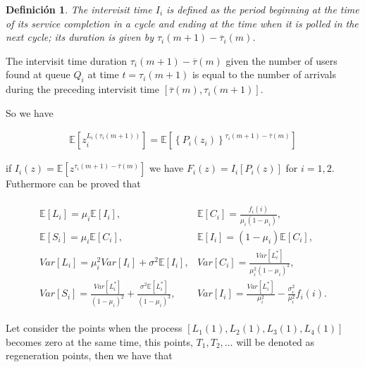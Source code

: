 \documentclass{article}
\newtheorem{Def}{Definición}
\newcommand{\esp}{\mathbb{E}}
\begin{document}
\begin{Def}
The intervisit time $I_{i}$ is defined as the period beginning at the time of its service completion in a cycle and ending at the time when it is polled in the next cycle; its duration is given by $\tau_{i}\left(m+1\right)-\overline{\tau}_{i}\left(m\right)$.
\end{Def}

The intervisit time duration $\tau_{i}\left(m+1\right)-\overline{\tau}\left(m\right)$ given the number of users found at queue $Q_{i}$ at time $t=\tau_{i}\left(m+1\right)$ is equal to the number of arrivals during the preceding intervisit time $\left[\overline{\tau}\left(m\right),\tau_{i}\left(m+1\right)\right]$. 

So we have



\begin{eqnarray*}
\esp\left[z_{i}^{L_{i}\left(\tau_{i}\left(m+1\right)\right)}\right]=\esp\left[\left\{P_{i}\left(z_{i}\right)\right\}^{\tau_{i}\left(m+1\right)-\overline{\tau}\left(m\right)}\right]
\end{eqnarray*}

if $I_{i}\left(z\right)=\esp\left[z^{\tau_{i}\left(m+1\right)-\overline{\tau}\left(m\right)}\right]$
we have $F_{i}\left(z\right)=I_{i}\left[P_{i}\left(z\right)\right]$
for $i=1,2$. Futhermore can be proved that

\begin{eqnarray}
\begin{array}{ll}
\esp\left[L_{i}\right]=\mu_{i}\esp\left[I_{i}\right], &
\esp\left[C_{i}\right]=\frac{f_{i}\left(i\right)}{\mu_{i}\left(1-\mu_{i}\right)},\\
\esp\left[S_{i}\right]=\mu_{i}\esp\left[C_{i}\right],&
\esp\left[I_{i}\right]=\left(1-\mu_{i}\right)\esp\left[C_{i}\right],\\
Var\left[L_{i}\right]= \mu_{i}^{2}Var\left[I_{i}\right]+\sigma^{2}\esp\left[I_{i}\right],& 
Var\left[C_{i}\right]=\frac{Var\left[L_{i}^{*}\right]}{\mu_{i}^{2}\left(1-\mu_{i}\right)^{2}},\\
Var\left[S_{i}\right]= \frac{Var\left[L_{i}^{*}\right]}{\left(1-\mu_{i}\right)^{2}}+\frac{\sigma^{2}\esp\left[L_{i}^{*}\right]}{\left(1-\mu_{i}\right)^{3}},&
Var\left[I_{i}\right]= \frac{Var\left[L_{i}^{*}\right]}{\mu_{i}^{2}}-\frac{\sigma_{i}^{2}}{\mu_{i}^{2}}f_{i}\left(i\right).
\end{array}
\end{eqnarray}

Let consider the points when the process $\left[L_{1}\left(1\right),L_{2}\left(1\right),L_{3}\left(1\right),L_{4}\left(1\right)
\right]$ becomes zero at the same time, this points, $T_{1},T_{2},\ldots$ will be denoted as regeneration points, then we have that
\end{document}
